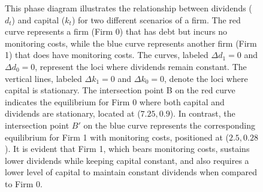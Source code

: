 \documentclass[12pt]{report}
\begin{document}
\begin{figure}
    \caption{This phase diagram illustrates the relationship between dividends (\(d_t\)) and capital (\(k_t\)) for two different
    scenarios of a firm. The red curve represents a firm (Firm 0) that has debt but incurs no monitoring costs, while
    the blue curve represents another firm (Firm 1) that does have monitoring costs. The curves, labeled
    \(\Delta d_1 = 0\) and \(\Delta d_0 = 0\), represent the loci where dividends remain constant. The vertical lines,
    labeled \(\Delta k_1 = 0\) and \(\Delta k_0 = 0\), denote the loci where capital is
    stationary. The intersection point B on the red curve indicates the equilibrium for Firm 0 where both capital and
    dividends are stationary, located at (\(7.25, 0.9\)). In contrast, the intersection point \(B'\) on the blue curve
    represents the corresponding equilibrium for Firm 1 with monitoring costs, positioned at (\(2.5, 0.28\)). It is
    evident that Firm 1, which bears monitoring costs, sustains lower dividends while keeping capital constant, and also
    requires a lower level of capital to maintain constant dividends when compared to Firm 0.}
    \label{pl_phase_b}

\end{figure}
        
        
        
       
\end{document}
